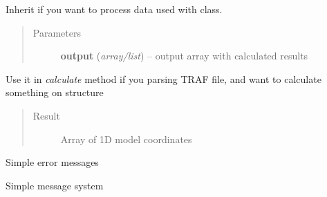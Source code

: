 \documentclass[letterpaper,10pt,english]{sphinxmanual}
\begin{document}
\begin{fulllineitems}
\label{index:pycabs.Calculate}
Inherit if you want to process data used with {\hyperref[index:pycabs.Monitor]{}} class.
\begin{quote}\begin{description}
\item[{Parameters}] \leavevmode
\textbf{output} (\emph{array/list}) -- output array with calculated results

\end{description}\end{quote}

\begin{fulllineitems}
\label{index:pycabs.Calculate.processTrajectory}
Use it in \emph{calculate} method if you parsing TRAF file, and want to calculate something on structure
\begin{quote}\begin{description}
\item[{Result }] \leavevmode
Array of 1D model coordinates

\end{description}\end{quote}

\end{fulllineitems}


\end{fulllineitems}


\begin{fulllineitems}
\label{index:pycabs.Errors}
Simple error messages

\end{fulllineitems}


\begin{fulllineitems}
\label{index:pycabs.Info}
Simple message system

\end{fulllineitems}

\end{document}
